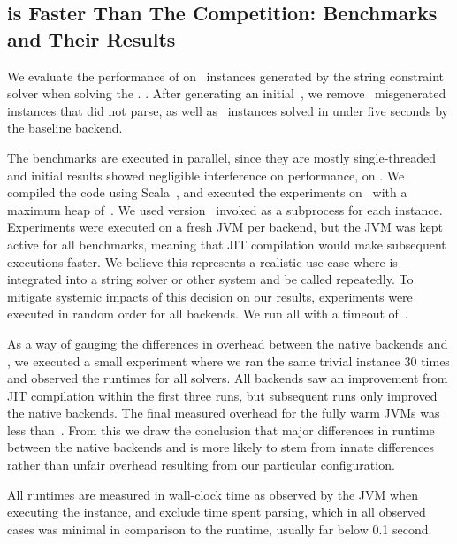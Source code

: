 \documentclass[acmsmall,review,anonymous]{acmart}\settopmatter{printfolios=true,printccs=false,printacmref=true}
\theoremstyle{definition}
\begin{document}
\subsection{\Catra{} is Faster Than The Competition: Benchmarks and Their Results}\label{sec:experiments}

We evaluate the performance of \Catra{} on~\NrBenchmarks{} instances generated by the \Ostrich{} string constraint solver when solving the . . After generating an initial~\InitialNrBenchmarks{}, we remove~\NrBroken{} misgenerated instances that did not parse, as well as~\NrTrivial{} instances solved in under five seconds by the baseline backend.

The benchmarks are executed in parallel, since they are mostly single-threaded and initial results showed negligible interference on performance, on \BenchmarkRig{}. We compiled the code using Scala~\ScalaVersion{}, and executed the experiments on~\JvmVersion{} with a maximum heap of~\MaxHeapSize{}. We used \Nuxmv{} version~\NuxmvVersion{} invoked as a subprocess for each instance. Experiments were executed on a fresh JVM per backend, but the JVM was kept active for all benchmarks, meaning that JIT compilation would make subsequent executions faster. We believe this represents a realistic use case where \Calculus{} is integrated into a string solver or other system and be called repeatedly. To mitigate systemic impacts of this decision on our results, experiments were executed in random order for all backends. We run all  with a timeout of~\RuntimeTimeout{}.

As a way of gauging the differences in overhead between the native backends and \Nuxmv{}, we executed a small experiment where we ran the same trivial instance 30 times and observed the runtimes for all solvers. All backends saw an improvement from JIT compilation within the first three runs, but subsequent runs only improved the native backends. The final measured overhead for the fully warm JVMs was less than~\OverheadSeconds{}. From this we draw the conclusion that major differences in runtime between the native backends and \Nuxmv{} is more likely to stem from innate differences rather than unfair overhead resulting from our particular configuration.

All runtimes are measured in wall-clock time as observed by the JVM when executing the instance, and exclude time spent parsing, which in all observed cases was minimal in comparison to the runtime, usually far below 0.1 second.
\end{document}
